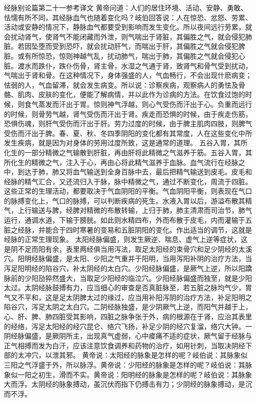 \documentclass[a4paper,12pt,UTF8,twoside]{ctexbook}
\begin{document}
经脉别论篇第二十一参考译文
黄帝问道：人们的居住环境、活动、安静、勇敢、怯懦有所不同，其经脉血气也随着变化吗？岐伯回答说：人在惊恐、忿怒、劳累、活动或安静的情况下，静脉血气都要受到影响而发生变化。所以夜间远行劳累，就会扰动肾气，使肾气不能闭藏而外泄，则气喘出于肾脏，其偏胜之气，就会侵犯肺脏。若因坠堕而受到恐吓，就会扰动肝气，而喘出于肝，其偏胜之气就会侵犯脾脏。或有所惊恐，惊则神越气乱，扰动肺气，喘出于肺，其偏胜之气就会侵犯心脏。渡水而跌仆，跌仆伤骨，肾主骨，水湿之气通于肾，致肾气和骨气受到扰动，气喘出于肾和骨。在这种情况下，身体强盛的人，气血畅行，不会出现什麽病变；怯弱的人，气血留滞，就会发生病变。所以说：诊察疾病，观察病人的勇怯及骨骼、肌肉、皮肤的变化，便能了解病情，并以此作为诊病的方法。在饮食过饱的时候，则食气蒸发而汗出于胃。惊则神气浮越，则心气受伤而汗出于心。负重而远行的时候，则骨劳气越，肾气受伤而汗出于肾。疾走而恐惧的时候，由于疾走伤筋，恐惧伤魂，则肝气受伤而汗出于肝。劳力过度的时候，由于脾主肌肉四肢，则脾气受伤而汗出于脾。春、夏、秋、冬四季阴阳的变化都有其常度，人在这些变化中所发生疾病，就是因为对身体的劳用过度所致，这是通常的道理。
五谷入胃，其所化生的一部分精微之气输散到肝脏，再由肝将此精微之气滋养于筋。五谷入胃，其所化生的精微之气，注入于心，再由心将此精气滋养于血脉。血气流行在经脉之中，到达于肺，肺又将血气输送到全身百脉中去，最后把精气输送到皮毛。皮毛和经脉的精气汇合，又还流归入于脉，脉中精微之气，通过不断变化，周流于四脏。这些正常的生理活动，都要取决于气血阴阳的平衡。气血阴阳平衡，则表现在气口的脉搏变化上，气口的脉搏，可以判断疾病的死生。水液入胃以后，游溢布散其精气，上行输送与脾，经脾对精微的布散转输，上归于肺，肺主清肃而司治节，肺气运行，通调水道，下输于膀胱。如此则水精四布，外而布散于皮毛，内而灌输于五脏之经脉，并能合于四时寒暑的变易和五脏阴阳的变化。作出适当的调节，这就是经脉的正常生理现象。
太阳经脉偏盛，则发生厥逆、喘息、虚气上逆等症状，这是阴不足而阳有余，表里两经俱当用泻法，取足太阳经的束骨穴和足少阴经的太溪穴。阳明经脉偏盛，是太阳、少阳之气重并于阳明，当用泻阳补阴的治疗方法，当泻足阳明经的陷谷穴，补太阴经的太白穴。少阳经脉偏盛，是厥气上逆，所以阳蹻脉前的少阳劢猝然盛大，当取足少阳经的临泣穴。少阳经脉偏盛而独至，就是少阳太过。太阴经脉鼓搏有力，应当细心的审查是否真脏脉至，若五脏之脉均气少，胃气又不平和，这是足太阴脾太过的缘过，应当用补阳泻阴的治疗方法，补足阳明之陷谷穴，泻足太阴之太白穴。二阴经脉独盛，是少阴厥气上逆，而阳气并越于上，心、肝、脾、肺四脏受其影响，四脏之脉争张于外，病的根源在于肾，应治其表里的经络，泻足太阳经的经穴昆仑、络穴飞扬，补足少阴的经穴复溜，络穴大钟。一阴经脉偏盛，是厥阴所主，出现真气虚弱，心中痠痛不适的症状，厥气留于经脉与正气相搏而发为白汗，应该注意饮食调养和药物的治疗，如用针刺，当取决阴经下部的太冲穴，以泄其邪。
黄帝说：太阳经的脉象是怎样的呢？岐伯说：其脉象似三阳之气浮盛于外，所以脉浮。黄帝说：少阳经的脉象是怎样的呢？岐伯说：其脉象似一阳之初生，滑而不实。黄帝说：阳明经的脉象是怎样的呢？岐伯说：其脉象大而浮。太阴经的脉象搏动，虽沉伏而指下仍搏击有力；少阴经的脉象搏动，是沉而不浮。
\end{document}
